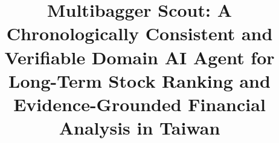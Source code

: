 \documentclass[conference]{IEEEtran}
\begin{document}
\title{Multibagger Scout: A Chronologically Consistent and Verifiable Domain AI Agent for Long-Term Stock Ranking and Evidence-Grounded Financial Analysis in Taiwan}

\author{
}

\maketitle
\end{document}
